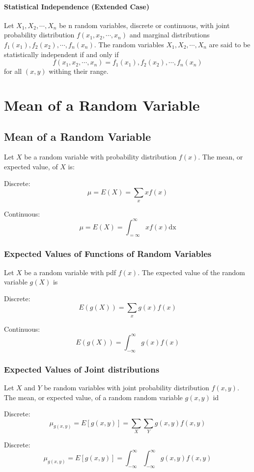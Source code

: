 \documentclass{book}
\begin{document}
\subsubsection{Statistical Independence (Extended Case)}
Let $X_1, X_2, \cdots , X_n$ be n random variables, discrete or continuous, with joint probability distribution $f(x_1, x_2, \cdots , x_n)$ and marginal distributions $f_1(x_1), f_2(x_2), \cdots , f_n(x_n)$. The random variables $X_1, X_2, \cdots , X_n$ are said to be statistically independent if and only if
$$f(x_1, x_2, \cdots, x_n) = f_1(x_1), f_2(x_2), \cdots , f_n(x_n)$$
for all $(x,y)$ withing their range.

\chapter{Mean of a Random Variable}

\section{Mean of a Random Variable}
Let $X$ be a random variable with probability distribution $f(x)$. The mean, or expected value, of $X$ is:

Discrete:
	$$\mu = E(X) = \sum_x x f(x)$$ 

Continuous:
	$$\mu = E(X) = \int_{=\infty}^\infty x f(x) \text{dx}$$


\subsection{Expected Values of Functions of Random Variables}

Let $X$ be a random variable with pdf $f(x)$. The expected value of the random variable $g(X)$ is

Discrete:
$$E(g(X))=\sum_x g(x)f(x)$$

Continuous:
$$E(g(X))=\int_{-\infty}^\infty g(x)f(x)$$

\subsection{Expected Values of Joint distributions}
Let $X$ and $Y$ be random variables with joint probability distribution $f(x,y)$. The mean, or expected value, of a random random variable $g(x,y)$ id

Discrete:
$$\mu_{g(x,y)}=E[g(x,y)] = \sum_X \sum_Y g(x,y)f(x,y)$$

Discrete:
$$\mu_{g(x,y)}=E[g(x,y)] = \int_{-\infty}^\infty \int_{-\infty}^\infty g(x,y)f(x,y)$$
\end{document}
